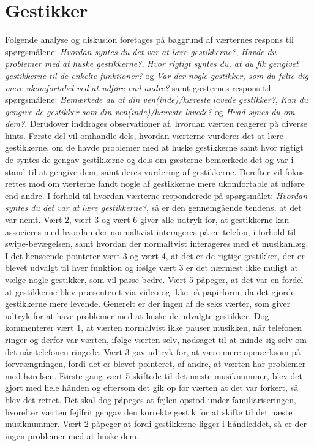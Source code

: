 \section{Gestikker}
\label{TestresultaterSocialAcceptGestikker}
%
Følgende analyse og diskusion foretages på baggrund af værternes respons til spørgsmålene: \textit{Hvordan syntes du det var at lære gestikkerne?}, \textit{Havde du problemer med at huske gestikkerne?}, \textit{Hvor rigtigt syntes du, at du fik gengivet gestikkerne til de enkelte funktioner?} og \textit{Var der nogle gestikker, som du følte dig mere ukomfortabel ved at udføre end andre?} samt gæsternes respons til spørgsmålene: \textit{Bemærkede du at din ven(inde)/kæreste lavede gestikker?}, \textit{Kan du gengive de gestikker som din ven(inde)/kæreste lavede?} og \textit{Hvad synes du om dem?}. Derudover inddrages observationer af, hvordan værten reagerer på diverse hints. Første del vil omhandle dels, hvordan værterne vurderer det at lære gestikkerne, om de havde problemer med at huske gestikkerne samt hvor rigtigt de syntes de gengav gestikkerne og dels om gæsterne bemærkede det og var i stand til at gengive dem, samt deres vurdering af gestikkerne. Derefter vil fokus rettes mod om værterne fandt nogle af gestikkerne mere ukomfortable at udføre end andre.\blankline
%
I forhold til hvordan værterne responderede på spørgsmålet: \textit{Hvordan syntes du det var at lære gestikkerne?}, så er den gennemgående tendens, at det var nemt. Vært 2, vært 3 og vært 6 giver alle udtryk for, at gestikkerne kan associeres med hvordan der normaltvist interageres på en telefon, i forhold til swipe-bevægelsen, samt hvordan der normaltvist interageres med et musikanlæg. I det henseende pointerer vært 3 og vært 4, at det er de rigtige gestikker, der er blevet udvalgt til hver funktion og ifølge vært 3 er det nærmest ikke muligt at vælge nogle gestikker, som vil passe bedre. Vært 5 påpeger, at det var en fordel at gestikkerne blev præsenteret via video og ikke på papirform, da det gjorde gestikkerne mere levende. Generelt er der ingen af de seks værter, som giver udtryk for at have problemer med at huske de udvalgte gestikker. Dog kommenterer vært 1, at værten normalvist ikke pauser musikken, når telefonen ringer og derfor var værten, ifølge værten selv, nødsaget til at minde sig selv om det når telefonen ringede. Vært 3 gav udtryk for, at være mere opmærksom på forvrængningen, fordi det er blevet pointeret, af andre, at værten har problemer med hørelsen. Første gang vært 5 skiftede til det næste musiknummer, blev det gjort med hele hånden og eftersom det gik op for værten at det var forkert, så blev det rettet. Det skal dog påpeges at fejlen opstod under familiariseringen, hvorefter værten fejlfrit gengav den korrekte gestik for at skifte til det næste musiknummer. Vært 2 påpeger at fordi gestikkerne ligger i håndleddet, så er der ingen problemer med at huske dem. 

